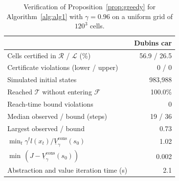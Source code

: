 \begin{table}[t]
\caption{Verification of Proposition~\ref{prop:greedy} for Algorithm~\ref{alg:alg1} with $\gamma=0.96$ on a uniform grid of $120^3$ cells.}
\label{tab:ra_verification}
\small
\begin{tabular}{lr}
\toprule
 & Dubins car \\
\midrule
Cells certified in $\mathcal R$ / $\mathcal L$ (\%) & 56.9 / 26.5 \\
Certificate violations (lower / upper) & 0 / 0 \\
Simulated initial states & 983{,}988 \\
Reached $\mathcal T$ without entering $\mathcal F$ & 100.0\% \\
Reach-time bound violations & 0 \\
Median observed / bound (steps) & 19 / 36 \\
Largest observed / bound & 0.73 \\
$\min_t \gamma^t l(x_t)/\underline V_\gamma^{\mathrm{cons}}(s_0)$ & 1.02 \\
$\min\,(J-\underline V_\gamma^{\mathrm{cons}}(s_0))$ & 0.002 \\
Abstraction and value iteration time (s) & 2.1 \\
\bottomrule
\end{tabular}
\end{table}
